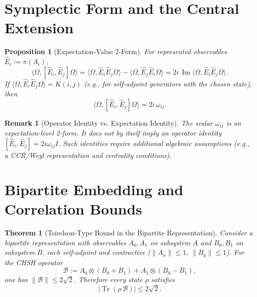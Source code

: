 \documentclass[11pt, a4paper]{article}
\newtheorem{theorem}{Theorem}
\newtheorem{proposition}{Proposition}
\newtheorem{remark}{Remark}
\begin{document}
\section{Symplectic Form and the Central Extension}

\begin{proposition}[Expectation-Value 2-Form]
For represented observables $\hat E_i:=\pi(A_i)$,
\begin{equation}
    \langle\Omega,[\hat E_i,\hat E_j]\Omega\rangle
    =\langle\Omega,\hat E_i\hat E_j\Omega\rangle-\langle\Omega,\hat E_j\hat E_i\Omega\rangle
    =2i\,\operatorname{Im}\langle\Omega,\hat E_i\hat E_j\Omega\rangle.
\end{equation}
If $\langle\Omega,\hat E_i\hat E_j\Omega\rangle=K(i,j)$ (e.g., for self-adjoint generators with the chosen state), then
\begin{equation}
\langle\Omega,[\hat E_i,\hat E_j]\Omega\rangle=2i\,\omega_{ij}.
\end{equation}
\end{proposition}

\begin{remark}[Operator Identity vs. Expectation Identity]
The scalar $\omega_{ij}$ is an expectation-level 2-form. It does not by itself imply an operator identity $[\hat E_i,\hat E_j]=2i\omega_{ij}I$. Such identities require additional algebraic assumptions (e.g., a CCR/Weyl representation and centrality conditions).
\end{remark}

\section{Bipartite Embedding and Correlation Bounds}

\begin{theorem}[Tsirelson-Type Bound in the Bipartite Representation]
Consider a bipartite representation with observables $A_0,A_1$ on subsystem $A$ and $B_0,B_1$ on subsystem $B$, each self-adjoint and contractive ($\|A_x\|\le 1$, $\|B_y\|\le 1$). For the CHSH operator
\begin{equation}
\mathcal{B}:=A_0\otimes(B_0+B_1)+A_1\otimes(B_0-B_1),
\end{equation}
one has $\|\mathcal{B}\|\le 2\sqrt{2}$. Therefore every state $\rho$ satisfies
\begin{equation}
|\operatorname{Tr}(\rho\,\mathcal{B})|\le 2\sqrt{2}.
\end{equation}
\end{theorem}
\end{document}
